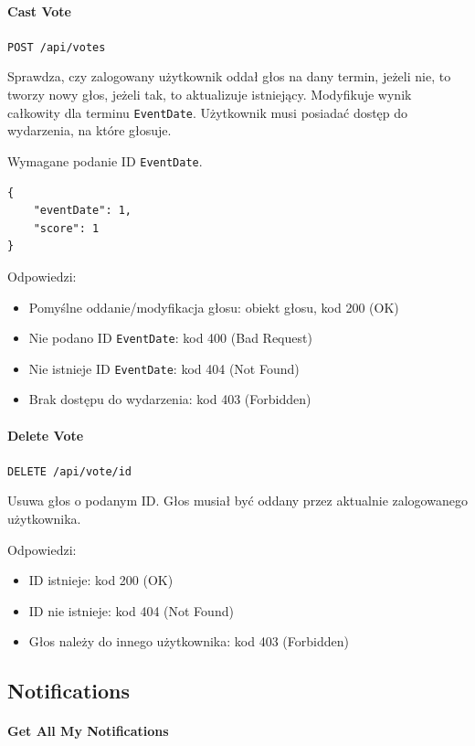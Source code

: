 \documentclass[a4paper,twoside,12pt]{book}
\begin{document}
\paragraph{Cast Vote}

\texttt{POST /api/votes}

Sprawdza, czy zalogowany użytkownik oddał głos na dany termin, jeżeli nie, to tworzy nowy głos, jeżeli tak, to aktualizuje istniejący. Modyfikuje wynik całkowity dla terminu \texttt{EventDate}. Użytkownik musi posiadać dostęp do wydarzenia, na które głosuje.

Wymagane podanie ID \texttt{EventDate}.

\begin{verbatim}
{
    "eventDate": 1,
    "score": 1
}
\end{verbatim}

Odpowiedzi: 
\begin{itemize}
	\item Pomyślne oddanie/modyfikacja głosu: obiekt głosu, kod 200 (OK) 
	\item Nie podano ID \texttt{EventDate}: kod 400 (Bad Request) 
	\item Nie istnieje ID \texttt{EventDate}: kod 404 (Not Found)
	\item Brak dostępu do wydarzenia: kod 403 (Forbidden)
\end{itemize}

\paragraph{Delete Vote}

\texttt{DELETE /api/vote/{id}}

Usuwa głos o podanym ID. Głos musiał być oddany przez aktualnie zalogowanego użytkownika.

Odpowiedzi: 
\begin{itemize}
	\item ID istnieje: kod 200 (OK) 
	\item ID nie istnieje: kod 404 (Not Found)
	\item Głos należy do innego użytkownika: kod 403 (Forbidden)
\end{itemize}

\subsection{Notifications}

\paragraph{Get All My Notifications}
\end{document}
